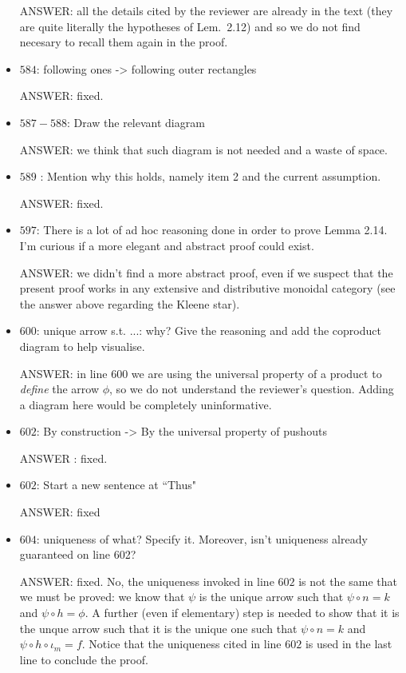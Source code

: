 \documentclass[english,11pt,a4paper]{article}
\begin{document}
\begin{itemize}
ANSWER: all the details cited by the reviewer are already in the text (they are quite literally the hypotheses of Lem.~2.12) and so we do not find necesary to recall them again in the proof.

\item $584$: following ones -> following outer rectangles

ANSWER: fixed.

\item $587-588$: Draw the relevant diagram

ANSWER: we think that such diagram is not needed and a waste of space.


\item $589$ : Mention why this holds, namely item 2 and the current assumption.

ANSWER: fixed.


\item $597$: There is a lot of ad hoc reasoning done in order to prove Lemma 2.14. I'm curious if a more elegant and abstract proof could exist.

ANSWER: we didn't find a more abstract proof, even if we suspect that the present proof works in any extensive and distributive monoidal category (see the answer above regarding the Kleene star).


\item $600$: unique arrow s.t. ...: why? Give the reasoning and add the coproduct diagram to help visualise.

ANSWER: in line $600$ we are using the universal property of a product to \emph{define} the arrow $\phi$, so we do not understand the reviewer's question. Adding a diagram here would be completely uninformative.


\item $602$: By construction -> By the universal property of pushouts

ANSWER : fixed.

\item $602$: Start a new sentence at ``Thus"

ANSWER: fixed

\item $604$: uniqueness of what? Specify it. Moreover, isn't uniqueness already guaranteed on line 602?

ANSWER: fixed. No, the uniqueness invoked in line $602$ is not the same that we must be proved: we know that $\psi$ is the unique arrow such that $\psi \circ n=k$ and $\psi \circ h =\phi$. A further (even if elementary) step is needed to show that it is the unque arrow such that it is the unique one such that $\psi \circ n=k$ and $\psi \circ h \circ \iota_m=f$. Notice that the uniqueness cited in line $602$ is used in the last line to conclude the proof.



\end{itemize}
\end{document}
